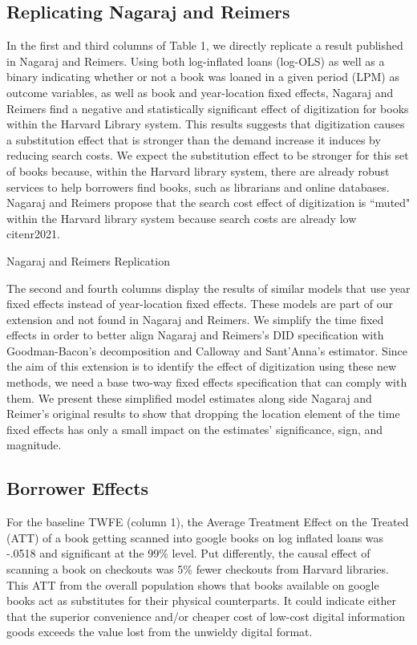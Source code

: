 \documentclass{article}
\begin{document}
\subsection{Replicating Nagaraj and Reimers}

In the first and third columns of Table 1, we directly replicate a result published in Nagaraj and Reimers. Using both log-inflated loans (log-OLS) as well as a binary indicating whether or not a book was loaned in a given period (LPM) as outcome variables, as well as book and year-location fixed effects, Nagaraj and Reimers find a negative and statistically significant effect of digitization for books within the Harvard Library system. This results suggests that digitization causes a substitution effect that is stronger than the demand increase it induces by reducing search costs. We expect the substitution effect to be stronger for this set of books because, within the Harvard library system, there are already robust services to help borrowers find books, such as librarians and online databases. Nagaraj and Reimers propose that the search cost effect of digitization is ``muted" within the Harvard library system because search costs are already low cite{nr2021}. 

\begin{table}[htbp]
   \centering
   \caption{Nagaraj and Reimers Replication}
  
   \label{tab:booktabs}
\end{table}

The second and fourth columns display the results of similar models that use year fixed effects instead of year-location fixed effects. These models are part of our extension and not found in Nagaraj and Reimers. We simplify the time fixed effects in order to better align Nagaraj and Reimers's DID specification with Goodman-Bacon's decomposition and Calloway and Sant'Anna's estimator. Since the aim of this extension is to identify the effect of digitization using these new methods, we need a base two-way fixed effects specification that can comply with them. We present these simplified model estimates along side Nagaraj and Reimer's original results to show that dropping the location element of the time fixed effects has only a small impact on the estimates' significance, sign, and magnitude.

\subsection{Borrower Effects}
For the baseline TWFE (column 1), the Average Treatment Effect on the Treated (ATT) of a book getting scanned into google books on log inflated loans was -.0518 and significant at the 99\% level. Put differently, the causal effect of scanning a book on checkouts was 5\% fewer checkouts from Harvard libraries. This ATT from the overall population shows that books available on google books act as substitutes for their physical counterparts. It could indicate either that the superior convenience and/or cheaper cost of low-cost digital information goods exceeds the value lost from the unwieldy digital format. 
\end{document}
